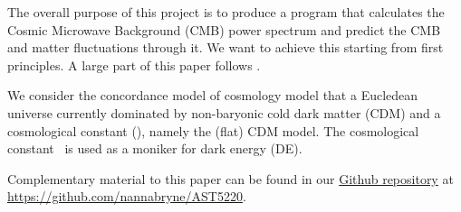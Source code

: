 





The overall purpose of this project is to produce a program that calculates the Cosmic Microwave Background (CMB) power spectrum and predict the CMB and matter fluctuations through it. We want to achieve this starting from first principles. A large part of this paper follows \citep{Callin2006}.

We consider the concordance model of cosmology model that a Eucledean universe currently dominated by non-baryonic cold dark matter (CDM) and a cosmological constant (\textLambda), namely the (flat) \textLambda CDM model. The cosmological constant \textLambda\, is used as a moniker for dark energy (DE). \citep{DodelsonBook}

Complementary material to this paper can be found in our \href{https://github.com/nannabryne/AST5220}{Github repository} at \url{https://github.com/nannabryne/AST5220}.